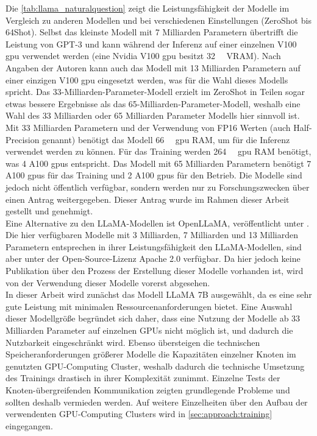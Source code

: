 Die \cref{tab:llama_naturalquestion} zeigt die Leistungsfähigkeit der Modelle im Vergleich zu anderen Modellen und bei verschiedenen Einstellungen (ZeroShot bis 64Shot).
Selbst das kleinste Modell mit 7 Milliarden Parametern übertrifft die Leistung von GPT-3 und kann während der Inferenz auf einer einzelnen V100 \ac{gpu} verwendet werden (eine Nvidia V100 \ac{gpu} besitzt \SI{32}{\giga\byte} VRAM).
Nach Angaben der Autoren kann auch das Modell mit 13 Milliarden Parametern auf einer einzigen V100 \ac{gpu} eingesetzt werden, was für die Wahl dieses Modells spricht.
Das 33-Milliarden-Parameter-Modell erzielt im ZeroShot in Teilen sogar etwas bessere Ergebnisse als das 65-Milliarden-Parameter-Modell, weshalb eine Wahl des 33 Milliarden oder 65 Milliarden Parameter Modells hier sinnvoll ist.
Mit 33 Milliarden Parametern und der Verwendung von FP16 Werten (auch Half-Precision genannt) benötigt das Modell \SI{66}{\giga\byte} \ac{gpu} RAM, um für die Inferenz verwendet werden zu können.
Für das Training werden \SI{264}{\giga\byte} \ac{gpu} RAM benötigt, was 4 A100 \ac{gpu}s entspricht.
Das Modell mit 65 Milliarden Parametern benötigt 7 A100 \ac{gpu}s für das Training und 2 A100 \ac{gpu}s für den Betrieb.
Die Modelle sind jedoch nicht öffentlich verfügbar, sondern werden nur zu Forschungszwecken über einen Antrag weitergegeben.
Dieser Antrag wurde im Rahmen dieser Arbeit gestellt und genehmigt.\\

Eine Alternative zu den LLaMA-Modellen ist OpenLLaMA, veröffentlicht unter \citet{openllama}.
Die hier verfügbaren Modelle mit 3 Milliarden, 7 Milliarden und 13 Milliarden Parametern entsprechen in ihrer Leistungsfähigkeit den LLaMA-Modellen, sind aber unter der Open-Source-Lizenz Apache 2.0 verfügbar. Da hier jedoch keine Publikation über den Prozess der Erstellung dieser Modelle vorhanden ist, wird von der Verwendung dieser Modelle vorerst abgesehen.\\

In dieser Arbeit wird zunächst das Modell LLaMA 7B ausgewählt, da es eine sehr gute Leistung mit minimalen Ressourcenanforderungen bietet.
Eine Auswahl dieser Modellgröße begründet sich daher, dass eine Nutzung der Modelle ab 33 Milliarden Parameter auf einzelnen GPUs nicht möglich ist, und dadurch die Nutzbarkeit eingeschränkt wird.
Ebenso übersteigen die technischen Speicheranforderungen größerer Modelle die Kapazitäten einzelner Knoten im genutzten GPU-Computing Cluster, weshalb dadurch die technische Umsetzung des Trainings drastisch in ihrer Komplexität zunimmt.
Einzelne Tests der Knoten-übergreifenden Kommunikation zeigten grundlegende Probleme und sollten deshalb vermieden werden.
Auf weitere Einzelheiten über den Aufbau der verwendenten GPU-Computing Clusters wird in \cref{sec:approach:training} eingegangen.\\

